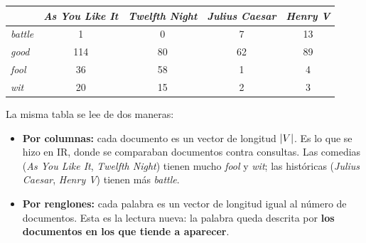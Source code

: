 \documentclass[11pt,letterpaper]{article}
\begin{document}
\begin{ejemplo}
    \begin{center}
    \begin{tabular}{lcccc}
        \toprule
        & \textit{As You Like It} & \textit{Twelfth Night}
        & \textit{Julius Caesar} & \textit{Henry V} \\
        \midrule
        \textit{battle} & 1   & 0  & 7  & 13 \\
        \textit{good}   & 114 & 80 & 62 & 89 \\
        \textit{fool}   & 36  & 58 & 1  & 4  \\
        \textit{wit}    & 20  & 15 & 2  & 3  \\
        \bottomrule
    \end{tabular}
    \end{center}
\end{ejemplo}

La misma tabla se lee de dos maneras:

\begin{itemize}[itemsep=0.3em]
    \item \textbf{Por columnas:} cada documento es un vector de
          longitud $\left\lvert V \right\rvert$. Es lo que se hizo en IR, donde se
          comparaban documentos contra consultas. Las comedias
          (\textit{As You Like It}, \textit{Twelfth Night}) tienen
          mucho \textit{fool} y \textit{wit}; las históricas
          (\textit{Julius Caesar}, \textit{Henry V}) tienen más
          \textit{battle}.
    \item \textbf{Por renglones:} cada palabra es un vector de longitud
          igual al número de documentos. Esta es la lectura nueva: la
          palabra queda descrita por \textbf{los documentos en los que
          tiende a aparecer}.
\end{itemize}
\end{document}
